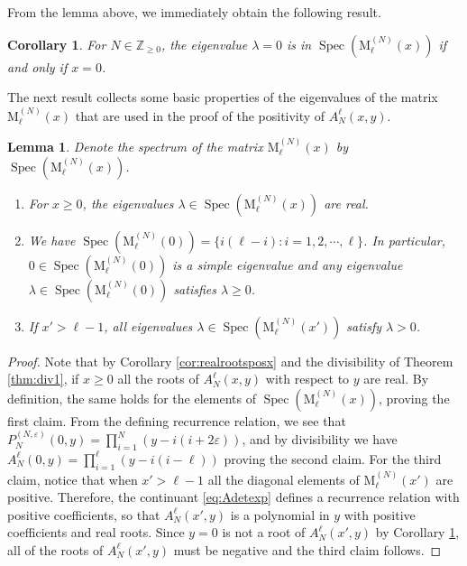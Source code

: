 \documentclass[11pt]{article}
\numberwithin{equation}{section}
\newcommand{\Z}{\mathbb{Z}} %
\newcommand{\e}{\varepsilon}
\newcommand{\cp}[2]{P^{(#1)}_{#2}} %
\DeclareMathOperator{\Spec}{Spec}
\newcommand{\MatSymbol}[1]{\bm{\mathrm{#1}}}
\newcommand{\mM}{\MatSymbol{M}}
\theoremstyle{plain}
\newtheorem{lem}[thm]{Lemma}
\newtheorem{cor}[thm]{Corollary}
\theoremstyle{definition}
\theoremstyle{remark}
\begin{document}
From the lemma above, we immediately obtain the following result.

\begin{cor}
  \label{cor:zeroeigen}
  For \(N \in \Z_{\geq 0}\), the eigenvalue \(\lambda =0\) is in  \(\Spec(\mM^{(N)}_\ell(x))\) if and only if \(x = 0\).
\end{cor}

The next result collects some basic properties of the eigenvalues of the matrix \(\mM^{(N)}_\ell(x)\) that
are used in the proof of the positivity of \(A_N^{\ell}(x,y)\).

\begin{lem}
  \label{lem:eigenprop}
  Denote the spectrum of the matrix \(\mM^{(N)}_\ell(x)\) by \(\Spec(\mM^{(N)}_\ell(x))\).
  \begin{enumerate}[$(1)$]
  \item For \(x \geq 0 \), the eigenvalues \( \lambda \in \Spec(\mM^{(N)}_\ell(x))\) are real.
  \item We have \( \Spec(\mM^{(N)}_\ell(0)) = \{ i(\ell-i) : i=1,2,\cdots,\ell \}\).
    In particular, \( 0 \in \Spec(\mM^{(N)}_\ell(0)) \) is a simple eigenvalue and
    any eigenvalue \(\lambda \in \Spec(\mM^{(N)}_\ell(0)) \) satisfies \( \lambda \geq 0\).
  \item If \( x' > \ell-1\), all eigenvalues  \( \lambda \in \Spec(\mM^{(N)}_\ell(x'))  \)
    satisfy \( \lambda > 0\).
  \end{enumerate}
\end{lem}

\begin{proof}
  Note that by Corollary \ref{cor:realrootsposx} and the divisibility of Theorem \ref{thm:div1}, if \(x \geq 0 \) all the roots of \(A_N^\ell(x,y)\) with
  respect to  \(y\) are real. By definition, the same holds for the elements of \(\Spec(\mM^{(N)}_\ell(x))\), proving the first claim.
  From the defining recurrence relation, we see that \(\cp{N,\e}{N}(0,y) = \prod_{i=1}^{N}(y - i(i+2\e))\), and by divisibility we have
  \(A_N^{\ell}(0,y) = \prod_{i=1}^\ell(y - i(i - \ell)) \) proving the second claim. For the third claim, notice that when \(x' > \ell-1 \) all
  the diagonal elements of \(\mM^{(N)}_\ell(x')\) are positive. Therefore, the continuant \eqref{eq:Adetexp} defines a recurrence relation with
  positive coefficients, so that \(A_N^{\ell}(x',y)\) is a polynomial in \(y\) with positive coefficients and real roots. Since \(y=0 \) is not
  a root of \(A_N^{\ell}(x',y)\) by Corollary \ref{cor:zeroeigen}, all of the roots of \(A_N^{\ell}(x',y)\) must be negative and the third claim follows. 
\end{proof}
\end{document}
